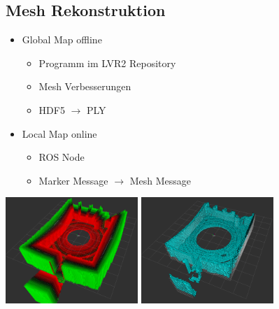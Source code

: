 \documentclass{beamer}
\begin{document}
\subsection{Mesh Rekonstruktion}
\begin{frame}{\subsecname}
\begin{itemize}
\item{Global Map offline}
\begin{itemize}
\item{Programm im LVR2 Repository}
\item{Mesh Verbesserungen}
\item{HDF5 $\rightarrow$ PLY}
\end{itemize}
\item{Local Map online}
\begin{itemize}
\item{ROS Node}
\item{Marker Message $\rightarrow$ Mesh Message}
\end{itemize}
\end{itemize}

\begin{center}
\includegraphics[width=5cm]{images/ReconstructionTSDF.png}
\includegraphics[width=5cm]{images/ReconstructionMesh.png}
\end{center}
\end{frame}
\end{document}
